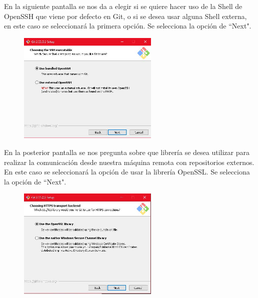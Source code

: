 \documentclass[10pt,a4paper]{article} %
\begin{document}
\begin{enumerate}
{			\pagebreak
			\item En la siguiente pantalla se nos da a elegir si se quiere hacer uso de la Shell de OpenSSH que viene por defecto en Git, o si se desea usar alguna Shell externa, en este caso se seleccionar{\' a} la primera opci{\' o}n. Se selecciona la opci{\' o}n de ``Next".
			\begin{figure}[H]
				\includegraphics[width=0.6\textwidth]{11.jpg}
				\centering
				\label{img:paso11}
			\end{figure}
			\item En la posterior pantalla se nos pregunta sobre que librer{\' i}a se desea utilizar para realizar la comunicaci{\' o}n desde nuestra máquina remota con repositorios externos. En este caso se seleccionar{\' a} la opci{\' o}n de usar la librería OpenSSL. Se selecciona la opci{\' o}n de ``Next".
			\begin{figure}[H]
				\includegraphics[width=0.6\textwidth]{12.jpg}
				\centering
				\label{img:paso12}
			\end{figure}
			
}
\end{enumerate}
\end{document}
